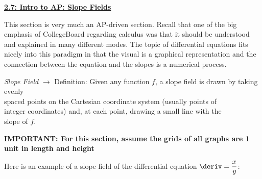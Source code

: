 \textbf{\underline{\large{2.7: Intro to AP: Slope Fields}}} \par

This section is very much an AP-driven section. Recall that one of the big emphasis of CollegeBoard regarding calculus was that it should be understood and explained in many different modes. The topic of differential equations fits nicely into this paradigm in that the visual is a graphical representation and the connection between the equation and the slopes is a numerical process. \par

\begin{tcolorbox}[definition]
    \begin{tabbing}
        \textit{Slope Field} $\rightarrow$ \= Definition: Given any function $f$, a slope field is drawn by taking evenly \\
        \> spaced points on the Cartesian coordinate system (usually points of \\
        \> integer coordinates) and, at each point, drawing a small line with the \\
        \> slope of $f$.
    \end{tabbing}
\end{tcolorbox}

\textbf{IMPORTANT: For this section, assume the grids of all graphs are 1 unit in length and height}

Here is an example of a slope field of the differential equation $\deriv = \dfrac{x}{y}$: \par

